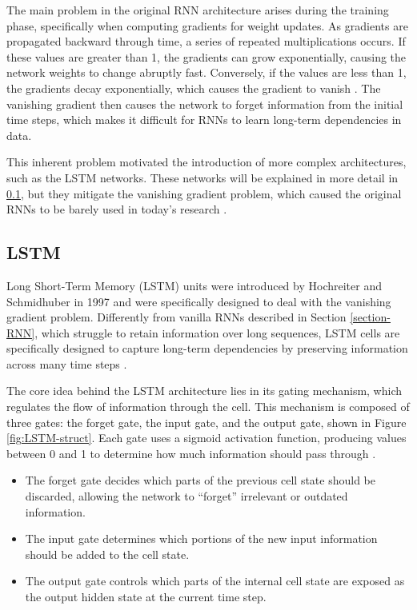 The main problem in the original RNN architecture arises during the training phase, specifically when computing gradients for weight updates. As gradients are propagated backward through time, a series of repeated multiplications occurs. If these values are greater than 1, the gradients can grow exponentially, causing the network weights to change abruptly fast. Conversely, if the values are less than 1, the gradients decay exponentially, which causes the gradient to vanish \cite{kolen,pmlr-v9-glorot10a}. The vanishing gradient then causes the network to forget information from the initial time steps, which makes it difficult for RNNs to learn long-term dependencies in data.

This inherent problem motivated the introduction of more complex architectures, such as the LSTM networks. These networks will be explained in more detail in \ref{sec-LSTM}, but they mitigate the vanishing gradient problem, which caused the original RNNs to be barely used in today's research \cite{fang-wei,GAO2019279}.

\subsection{LSTM} \label{sec-LSTM}

Long Short-Term Memory (LSTM) units were introduced by Hochreiter and Schmidhuber in 1997 \cite{Hochreiter} and were specifically designed to deal with the vanishing gradient problem. Differently from vanilla RNNs described in Section \ref{section-RNN}, which struggle to retain information over long sequences, LSTM cells are specifically designed to capture long-term dependencies by preserving information across many time steps \cite{ALSELWI2024102068}.

The core idea behind the LSTM architecture lies in its gating mechanism, which regulates the flow of information through the cell. This mechanism is composed of three gates: the forget gate, the input gate, and the output gate, shown in Figure \ref{fig:LSTM-struct}. Each gate uses a sigmoid activation function, producing values between 0 and 1 to determine how much information should pass through \cite{schmidt2019recurrentneuralnetworksrnns}.

\begin{itemize}
    \item The forget gate decides which parts of the previous cell state should be discarded, allowing the network to “forget” irrelevant or outdated information. 
    \item The input gate determines which portions of the new input information should be added to the cell state.
    \item The output gate controls which parts of the internal cell state are exposed as the output hidden state at the current time step.
\end{itemize}

